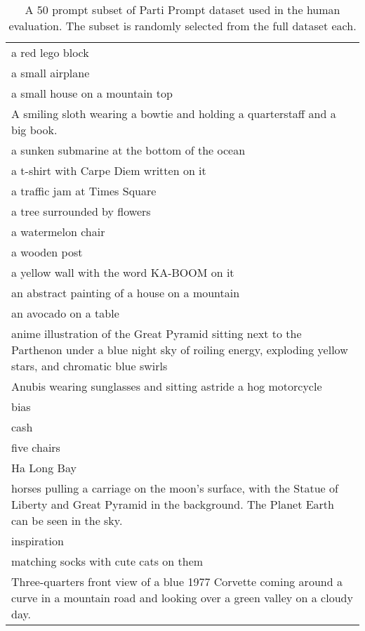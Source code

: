\begin{table*}[p]
\begin{tabular}{|p{\textwidth}|}
a red lego block \\
a small airplane \\
a small house on a mountain top \\
A smiling sloth wearing a bowtie and holding a quarterstaff and a big book. \\
a sunken submarine at the bottom of the ocean \\
a t-shirt with Carpe Diem written on it \\
a traffic jam at Times Square \\
a tree surrounded by flowers \\
a watermelon chair \\
a wooden post \\
a yellow wall with the word KA-BOOM on it \\
an abstract painting of a house on a mountain \\
an avocado on a table \\
anime illustration of the Great Pyramid sitting next to the Parthenon under a blue night sky of roiling energy, exploding yellow stars, and chromatic blue swirls \\
Anubis wearing sunglasses and sitting astride a hog motorcycle \\
bias \\
cash \\
five chairs \\
Ha Long Bay \\
horses pulling a carriage on the moon's surface, with the Statue of Liberty and Great Pyramid in the background. The Planet Earth can be seen in the sky. \\
inspiration \\
matching socks with cute cats on them \\
Three-quarters front view of a blue 1977 Corvette coming around a curve in a mountain road and looking over a green valley on a cloudy day. \\
\hline
\end{tabular}
\caption{A 50 prompt subset of Parti Prompt dataset used in the human evaluation. The subset is randomly selected from the full dataset each.}
\label{tab:pp_subset}
\end{table*}




